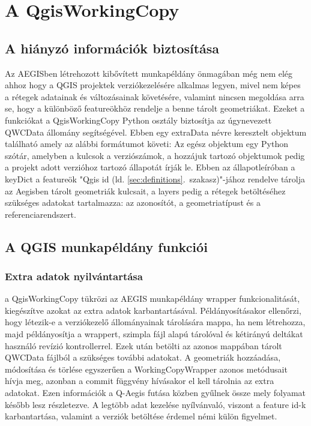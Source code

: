 \section{A QgisWorkingCopy}
\subsection{A  hiányzó információk biztosítása}
Az AEGISben létrehozott kibővített munkapéldány önmagában még nem elég ahhoz hogy a QGIS projektek verziókezelésére alkalmas legyen, mivel nem képes a rétegek adatainak és változásainak követésére, valamint nincsen megoldása arra se, hogy a különböző featureökhöz rendelje a benne tárolt geometriákat. Ezeket a funkciókat a QgisWorkingCopy Python osztály biztosítja az úgynevezett QWCData állomány segítségével. Ebben egy extraData névre keresztelt objektum található amely az alábbi formátumot követi:
Az egész objektum egy Python szótár, amelyben a kulcsok a verziószámok, a hozzájuk tartozó objektumok pedig a projekt adott verzióhoz tartozó állapotát írják le. Ebben az állapotleíróban a keyDict a featureök "Qgis id (ld. \ref{sec:definitions}.~szakasz)"-jához rendelve tárolja az Aegisben tárolt geometriák kulcsait, a layers pedig a rétegek betöltéséhez szükséges adatokat tartalmazza: az azonosítót, a geometriatípust és a referenciarendszert.
\subsection{A QGIS munkapéldány funkciói}
\subsubsection{Extra adatok nyilvántartása}
a QgisWorkingCopy tükrözi az AEGIS munkapéldány wrapper funkcionalitását, kiegészítve azokat az extra adatok karbantartásával. Példányosításakor ellenőrzi, hogy létezik-e a verziókezelő állományainak tárolására mappa, ha nem létrehozza, majd példányosítja a wrappert, szimpla fájl alapú tárolóval és kétirányú deltákat használó revízió kontrollerrel. Ezek után betölti az azonos mappában tárolt QWCData fájlból a szükséges további adatokat.
A geometriák hozzáadása, módosítása és törlése egyszerűen a WorkingCopyWrapper azonos metódusait hívja meg, azonban a commit függvény hívásakor el kell tárolnia az extra adatokat. Ezen információk a Q-Aegis futása közben gyűlnek össze mely folyamat később lesz részletezve. A legtöbb adat kezelése nyílvánvaló, viszont a feature id-k karbantartása, valamint a verziók betöltése érdemel némi külön figyelmet.
